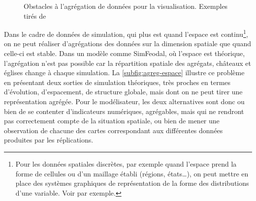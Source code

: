 \begin{figure}[H]
	\centering
	\hspace{5pt}
	\captionsetup[subfloat]{width=.55\linewidth}
	\captionsetup[subfloat]{width=.33\linewidth}
	\caption[Obstacles à l'agrégation de données pour la visualisation.]{Obstacles à l'agrégation de données pour la visualisation. Exemples tirés de \textcite{cura_visualisation_2020}}
\end{figure}


\noindent Dans le cadre de données de simulation, qui plus est quand l'espace est continu\footnote{
	Pour les données spatiales discrètes, par exemple quand l'espace prend la forme de cellules ou d'un maillage établi (régions, états\ldots), on peut mettre en place des systèmes graphiques de représentation de la forme des distributions d'une variable.
	Voir \textcite{ribecca_chart_2018} par exemple.
}, on ne peut réaliser d'agrégations des données sur la dimension spatiale que quand celle-ci est stable.
Dans un modèle comme SimFeodal, où l'espace est théorique, l'agrégation n'est pas possible car la répartition spatiale des agrégats, châteaux et églises change à chaque simulation.
La \cref{subfig:agreg-espace} illustre ce problème en présentant deux sorties de simulation théoriques, très proches en termes d'évolution, d'espacement, de structure globale, mais dont on ne peut tirer une représentation agrégée.
Pour le modélisateur, les deux alternatives sont donc ou bien de se contenter d'indicateurs numériques, agrégables, mais qui ne rendront pas correctement compte de la situation spatiale, ou bien de mener une observation de chacune des cartes correspondant aux différentes données produites par les réplications.


